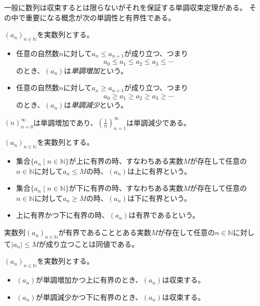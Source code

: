 一般に数列は収束するとは限らないがそれを保証する単調収束定理がある。
その中で重要になる概念が次の単調性と有界性である。

\begin{definition}[数列の単調性]
$(a_n)_{n \in \mathbb{N}}$を実数列とする。
\begin{itemize}
\item
任意の自然数$n$に対して$a_n \le a_{n+1}$が成り立つ、つまり
$$
a_0 \le a_1 \le a_2 \le a_3 \le \cdots
$$
のとき、$(a_n)$は\emph{単調増加}という。
\item
任意の自然数$n$に対して$a_n \ge a_{n+1}$が成り立つ、つまり
$$
a_0 \ge a_1 \ge a_2 \ge a_3 \ge \cdots
$$
のとき、$(a_n)$は\emph{単調減少}という。
\end{itemize}
\end{definition}

\begin{example}
$(n)_{n = 0}^\infty$は単調増加であり、$(\frac{1}{n})_{n = 1}^\infty$は単調減少である。
\end{example}

\begin{definition}[数列の有界性]
$(a_n)_{n \in \mathbb{N}}$を実数列とする。
\begin{itemize}
\item
集合$\{ a_n \mid n \in \mathbb{N} \}$が上に有界の時、すなわちある実数$M$が存在して任意の$n \in \mathbb{N}$に対して$a_n \le M$の時、$(a_n)$は上に有界という。
\item
集合$\{ a_n \mid n \in \mathbb{N} \}$が下に有界の時、すなわちある実数$M$が存在して任意の$n \in \mathbb{N}$に対して$a_n \ge M$の時、$(a_n)$は下に有界という。
\item
上に有界かつ下に有界の時、$(a_n)$は有界であるという。
\end{itemize}
\end{definition}

\begin{remark}
実数列$(a_n)_{n \in \mathbb{N}}$が有界であることとある実数$M$が存在して任意の$n \in \mathbb{N}$に対して$|a_n| \le M$が成り立つことは同値である。
\end{remark}

\begin{theorem}[単調収束定理]
\label{t_mono_conv}
$(a_n)_{n \in \mathbb{N}}$を実数列とする。
\begin{itemize}
\item
$(a_n)$が単調増加かつ上に有界のとき、$(a_n)$は収束する。
\item
$(a_n)$が単調減少かつ下に有界のとき、$(a_n)$は収束する。
\end{itemize}
\end{theorem}

